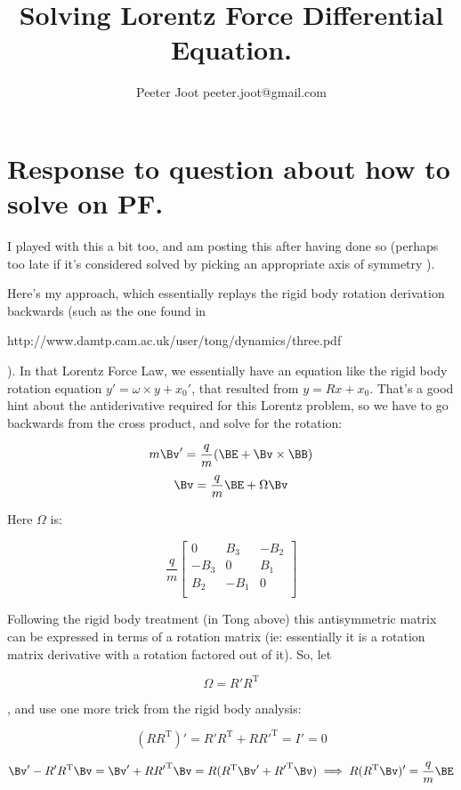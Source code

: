\documentclass{article}      %
\title{Solving Lorentz Force Differential Equation.} %
\author{Peeter Joot \quad peeter.joot@gmail.com}         %
\newcommand{\T}[0]{\text{T}}
\begin{document}

\maketitle{}

\section{ Response to question about how to solve on PF. }


I played with this a bit too, and am posting this after having done so (perhaps too late if it's considered solved by picking an appropriate axis of symmetry ).

Here's my approach, which essentially replays the rigid body rotation derivation backwards (such as the one found in 

http://www.damtp.cam.ac.uk/user/tong/dynamics/three.pdf

).  In that Lorentz Force Law, we essentially have an equation like the rigid body rotation equation $y' = \omega \times y + x_0'$, that resulted from $y = R x + x_0$.  That's a good hint about the antiderivative required for this Lorentz problem, so we have to go backwards from the cross product, and solve for the rotation:
 
\[
m \Bv' = \frac{q}{m} ( \BE + \Bv \times \BB )
\]
\[
\Bv = \frac{q}{m} \BE + \Omega \Bv
\]

Here $\Omega$ is:

\[
\frac{q}{m}
\begin{bmatrix}
0 & B_3 & -B_2 \\
-B_3 & 0 & B_1 \\
B_2 & -B_1 & 0 \\
\end{bmatrix}
\]

Following the rigid body treatment (in Tong above) this antisymmetric matrix can be expressed in terms of a rotation matrix (ie: essentially it is a rotation matrix derivative with a rotation factored out of it).  So, let

\[
\Omega = R' R^\T
\]

, and use one more trick from the rigid body analysis:

\[
(RR^\T)' = R' R^\T + R {R'}^\T = I' = 0
\]

\[
\Bv' - R' R^\T \Bv = \Bv' + R {R'}^\T \Bv = R (R^\T \Bv' + {R'}^\T \Bv) 
\implies 
R (R^\T \Bv)' = \frac{q}{m} \BE
\]
\end{document}
